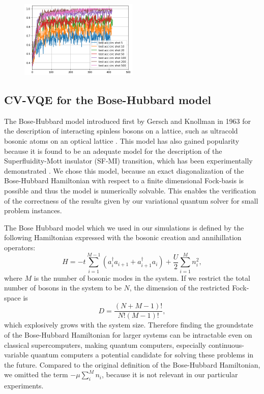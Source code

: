 \documentclass[12pt, a4paper,  nobibnotes]{article}
\begin{document}
\begin{figure}[H]
    \centering
    \includegraphics[width=0.5\textwidth]{figures/classifier-test-acc-shots.png}
    \caption{}
    \label{fig:single_layer_regression}
\end{figure}

\subsection{CV-VQE for the Bose-Hubbard model}
The Bose-Hubbard model introduced first by Gersch and Knollman in 1963 for the description of interacting spinless bosons on a lattice, such as ultracold bosonic atoms on an optical lattice
\cite{BoseHubbardOriginal,ColdAtomtHubbard}. This model has also gained popularity because it is found to be an adequate model for the description of the Superfluidity-Mott insulator (SF-MI) transition, which has been experimentally demonstrated \cite{SuperfluidityMottTransition,Greiner2002}.
We chose this model, because an exact diagonalization of the Bose-Hubbard Hamiltonian with respect to a finite dimensional Fock-basis is possible and thus the model is numerically solvable. This enables the verification of the correctness of the results given by our variational quantum solver for small problem instances.
\par
The Bose Hubbard model which we used in our simulations is defined by the following Hamiltonian expressed with the bosonic creation and annihillation operators:
\begin{equation}
     H = -t\sum\limits_{i=1}^{M-1}( a_{i}^\dagger  a_{i+1} +  a_{i+1}^\dagger  a_{i}) + \frac{U}{2}\sum\limits_{i=1}^{M} n_i^2 ,
     \label{eq:bhhamiltonian}
\end{equation}
where $M$ is the number of bosonic modes in the system. If we restrict the total number of bosons in the system to be $N$, the dimension of the restricted Fock-space is
\begin{equation}
    D = \frac{(N+M-1)!}{N!(M-1)!},
\end{equation}
which explosively grows with the system size. Therefore finding the groundstate of the Bose-Hubbard Hamiltonian for larger systems can be intractable even on classical supercomputers, making quantum computers, especially continuous-variable quantum computers a potential candidate for solving these problems in the future.
Compared to the original definition of the Bose-Hubbard Hamiltonian, we omitted the term $-\mu\sum\limits_{i}^{M} n_i$, because it is not relevant in our particular experiments.
\end{document}
